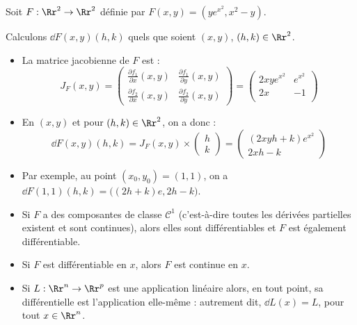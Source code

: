 \documentclass[11pt, class=report,crop=false]{standalone}
\begin{document}
\begin{exemple}
Soit $F : \Rr^2 \to \Rr^2$ définie par $F(x,y) = (ye^{x^2}, x^2-y)$.

Calculons $\dd F (x,y)(h,k)$ quels que soient $(x,y)$, $(h,k) \in \Rr^2$.

\begin{itemize}
  \item La matrice jacobienne de $F$ est :
$$J_F(x,y) = 
\begin{pmatrix}
\frac{\partial f_1}{\partial x} (x,y) & \frac{\partial f_1}{\partial y} (x,y) \\
\frac{\partial f_2}{\partial x} (x,y) & \frac{\partial f_2}{\partial y} (x,y)
\end{pmatrix}
= 
\begin{pmatrix}
2xye^{x^2} & e^{x^2} \\
2x & - 1 \\
\end{pmatrix}
$$  
  
  \item En $(x,y)$ et pour $(h,k) \in \Rr^2$, on a donc :
$$\dd F(x,y) (h,k) = J_F(x,y) \times \begin{pmatrix} h \\ k \end{pmatrix} = \begin{pmatrix}
(2xyh +k)e^{x^2} \\
2xh-k
\end{pmatrix}$$

  \item Par exemple, au point $(x_0,y_0) = (1,1)$, on a
  $\dd F (1,1) (h,k) = \big( (2h+k)e, 2h-k \big)$.
  

\end{itemize}
\end{exemple}


%

\begin{remarque*}
\sauteligne
\begin{itemize}

  \item Si $F$ a des composantes de classe $\mathcal{C}^1$ (c'est-à-dire toutes les dérivées partielles existent et sont continues), alors elles sont différentiables et $F$ est également différentiable.
  
  \item Si $F$ est différentiable en $x$, alors $F$ est continue en $x$.
  
  \item  Si $L : \Rr^n \to \Rr^p$ est une application linéaire alors, en tout point, sa  différentielle est l'application elle-même : autrement dit,  $\dd L(x) = L$, pour tout $x \in \Rr^n$. 
\end{itemize}
\end{remarque*}  
 
\end{document}
